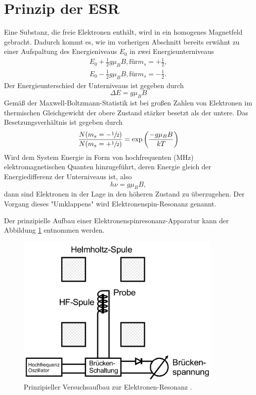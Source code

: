 \section{Prinzip der ESR}
Eine Substanz, die freie Elektronen enthält, wird in ein homogenes Magnetfeld gebracht.
Dadurch kommt es, wie im vorherigen Abschnitt bereits erwähnt zu einer Aufspaltung des Energieniveaus $E_0$ in zwei Energieunterniveaus
\begin{gather*}
  E_0 + \frac{1}{2}g\mu_{B}B, \text{für} m_s= +\frac{1}{2},\\
  E_0 - \frac{1}{2}g\mu_{B}B, \text{für} m_s= -\frac{1}{2}.
\end{gather*}
Der Energieunterschied der Unterniveaus ist gegeben durch
\begin{equation}
  \Delta E = g\mu_{B}B
\end{equation}
Gemäß der Maxwell-Boltzmann-Statistik ist bei großen Zahlen von Elektronen im thermischen Gleichgewicht der obere Zustand stärker besetzt als der untere.
Das Besetzungsverhältnis ist gegeben durch
\begin{equation*}
  \frac{N(m_s = -\sfrac{1}{2})}{N(m_s = +\sfrac{1}{2})} = \exp\left( \frac{-g\mu_{B}B}{kT} \right)
\end{equation*}
Wird dem System Energie in Form von hochfrequenten (MHz) elektromagnetischen Quanten hinzugeführt, deren Energie gleich der Energiedifferenz der Unterniveaus ist, also
\begin{equation}
  h\nu = g\mu_{B}B,
  \label{eqn:hv}
\end{equation}
dann sind Elektronen in der Lage in den höheren Zustand zu überzugehen.
Der Vorgang dieses "Umklappens" wird Elektronenspin-Resonanz genannt.

Der prinzipielle Aufbau einer Elektronenspinresonanz-Apparatur kann der Abbildung \ref{fig:ESR} entnommen werden.

\begin{figure}[H]
  \centering
  \includegraphics[width=10cm]{ESR.png}
  \caption{Prinzipieller Versuchsaufbau zur Elektronen-Resonanz \cite{skript}.}
  \label{fig:ESR}
\end{figure}

